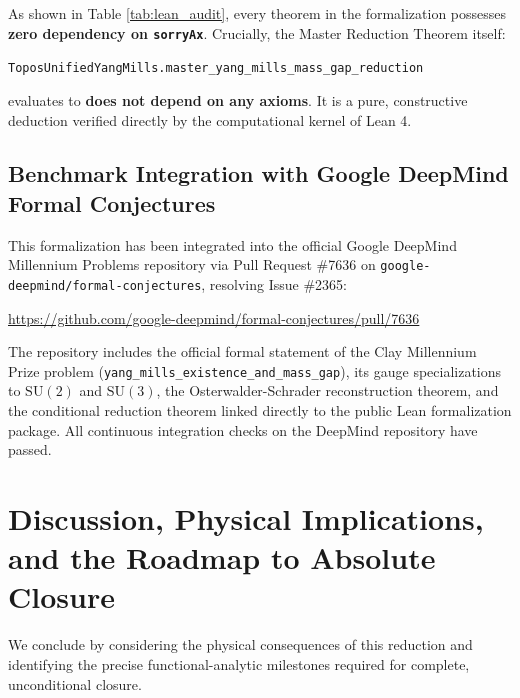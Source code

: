 \documentclass[11pt,reqno]{amsart}
\theoremstyle{plain}
\theoremstyle{definition}
\theoremstyle{remark}
\numberwithin{equation}{section}
\begin{document}
As shown in Table \ref{tab:lean_audit}, every theorem in the formalization possesses \textbf{zero dependency on \texttt{sorryAx}}. Crucially, the Master Reduction Theorem itself:
\begin{center}
\texttt{ToposUnifiedYangMills.master\_yang\_mills\_mass\_gap\_reduction}
\end{center}
evaluates to \textbf{does not depend on any axioms}. It is a pure, constructive deduction verified directly by the computational kernel of Lean 4.

\subsection{Benchmark Integration with Google DeepMind Formal Conjectures}
This formalization has been integrated into the official Google DeepMind Millennium Problems repository via Pull Request \#7636 on \texttt{google-deepmind/formal-conjectures}, resolving Issue \#2365:
\begin{center}
\url{https://github.com/google-deepmind/formal-conjectures/pull/7636}
\end{center}
The repository includes the official formal statement of the Clay Millennium Prize problem (\texttt{yang\_mills\_existence\_and\_mass\_gap}), its gauge specializations to $\mathrm{SU}(2)$ and $\mathrm{SU}(3)$, the Osterwalder-Schrader reconstruction theorem, and the conditional reduction theorem linked directly to the public Lean formalization package. All continuous integration checks on the DeepMind repository have passed.

\section{Discussion, Physical Implications, and the Roadmap to Absolute Closure}

We conclude by considering the physical consequences of this reduction and identifying the precise functional-analytic milestones required for complete, unconditional closure.
\end{document}
